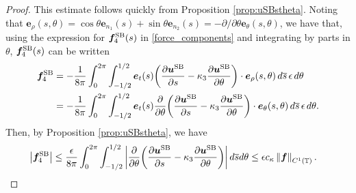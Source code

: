 \documentclass[11pt]{article}
\numberwithin{equation}{section}
\newcommand{\T}{\mathbb{T}}
\newcommand{\bars}{\overline s}
\newcommand{\bu}{\bm{u}}
\newcommand{\be}{\bm{e}}
\newcommand{\p}{\partial}
\newcommand{\ts}{\thinspace}
\newcommand{\SB}{{\rm SB}}
\newcommand{\abs}[1]{\left\lvert #1 \right\rvert}
\newcommand{\norm}[1]{\left\lVert #1 \right\rVert}
\newcommand{\wh}[1]{\widehat{#1}}
\newcommand{\mc}[1]{\mathcal{#1}}
\theoremstyle{definition}
\begin{document}
\begin{proof}
This estimate follows quickly from Proposition \ref{prop:uSBstheta}. Noting that $\be_\rho(s,\theta) = \cos\theta\be_{n_1}(s)+\sin\theta\be_{n_2}(s) = -\p/\p\theta \be_\theta(s,\theta)$, we have that, using the expression for $\bm{f}^{\SB}_4(s)$ in \eqref{force_components} and integrating by parts in $\theta$, $\bm{f}^{\SB}_4(s)$ can be written 
\begin{equation}\label{force_4}
\begin{aligned}
\bm{f}^{\SB}_4 & =-\frac{1}{8\pi} \int_0^{2\pi}\int_{-1/2}^{1/2} \be_t(s) \bigg(\frac{\p\bu^{\SB}}{\p s} - \kappa_3 \frac{\p \bu^{\SB}}{\p\theta}\bigg)\cdot\be_\rho(s,\theta) \ts d\bars \ts \epsilon \ts d\theta \\
&= -\frac{1}{8\pi} \int_0^{2\pi}\int_{-1/2}^{1/2} \be_t(s) \frac{\p}{\p\theta}\bigg(\frac{\p\bu^{\SB}}{\p s} - \kappa_3 \frac{\p \bu^{\SB}}{\p\theta}\bigg)\cdot\be_\theta(s,\theta) \ts d\bars \ts \epsilon \ts d\theta.
\end{aligned}
\end{equation} 
Then, by Proposition \ref{prop:uSBstheta}, we have
\begin{align*}
\abs{\bm{f}^{\SB}_4} &\le \frac{\epsilon}{8\pi}\int_0^{2\pi}\int_{-1/2}^{1/2} \bigg|\frac{\p}{\p\theta}\bigg(\frac{\p\bu^{\SB}}{\p s} - \kappa_3 \frac{\p \bu^{\SB}}{\p\theta}\bigg)\bigg| \ts d\bars d\theta \le \epsilon c_\kappa \norm{\bm{f}}_{C^1(\T)}.
\end{align*}

\end{proof}
\end{document}
